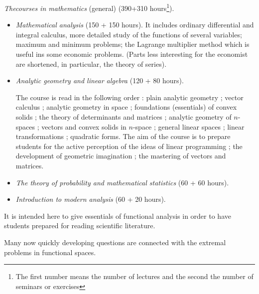 \textit{The\pageoriginale courses in mathematics} (general) (390+310
hours\footnote[1]{The first number means the number of lectures and the
  second the number of seminars or exercises}).
\begin{itemize}
\item[(1)] \textit{Mathematical analysis} (150 + 150 hours\footnotemark[1]). It includes ordinary differential and
  integral calculus, more detailed study of the functions of several
  variables; maximum and minimum problems; the Lagrange multiplier
  method which is useful ins some economic problems. (Parts less
  interesting for the economist are shortened, in particular, the
  theory of series).

\item[(2)] \textit{Analytic geometry and linear algebra} (120 + 80
  hours).

The course is read in the following order : plain analytic geometry ;
vector calculus ; analytic geometry in space ; foundations
(essentials) of convex solids ; the theory of determinants and
matrices ; analytic geometry of $n$-spaces ; vectors and convex solids
in $n$-space ; general linear spaces ; linear transformations ;
quadratic forms. The aim of the course is to prepare students for the
active perception of the ideas of linear programming ; the development
of geometric imagination ; the mastering of vectors and matrices. 

\item[(3)] \textit{The theory of probability and mathematical
  statistics}  (60 + 60 hours).

\item[(4)] \textit{Introduction to modern analysis} (60 + 20 hours).
\end{itemize}

It is intended here to give essentials of functional analysis in order
to have students prepared for reading scientific literature.

Many now quickly developing questions are connected with the extremal
problems in functional spaces.

